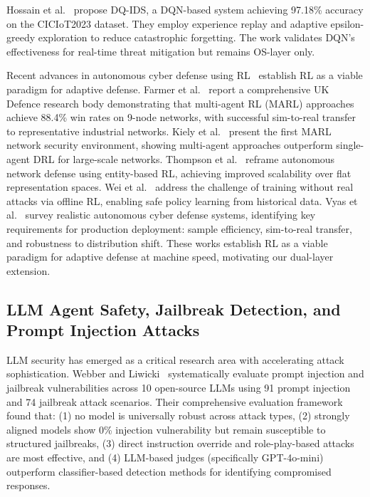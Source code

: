 \documentclass[conference]{IEEEtran}
\begin{document}
Hossain et al.~\cite{hossain2025deep} propose DQ-IDS, a DQN-based system achieving 97.18\% accuracy on the CICIoT2023 dataset. They employ experience replay and adaptive epsilon-greedy exploration to reduce catastrophic forgetting. The work validates DQN's effectiveness for real-time threat mitigation but remains OS-layer only.

Recent advances in autonomous cyber defense using RL~\cite{farmer2024rl,loevenich2025design,hammar2024rl4cybersecurity,kiely2025marl,thompson2024entity,wei2024offline,vyas2025deployment} establish RL as a viable paradigm for adaptive defense. Farmer et al.~\cite{farmer2024rl} report a comprehensive UK Defence research body demonstrating that multi-agent RL (MARL) approaches achieve 88.4\% win rates on 9-node networks, with successful sim-to-real transfer to representative industrial networks. Kiely et al.~\cite{kiely2025marl} present the first MARL network security environment, showing multi-agent approaches outperform single-agent DRL for large-scale networks. Thompson et al.~\cite{thompson2024entity} reframe autonomous network defense using entity-based RL, achieving improved scalability over flat representation spaces. Wei et al.~\cite{wei2024offline} address the challenge of training without real attacks via offline RL, enabling safe policy learning from historical data. Vyas et al.~\cite{vyas2025deployment} survey realistic autonomous cyber defense systems, identifying key requirements for production deployment: sample efficiency, sim-to-real transfer, and robustness to distribution shift. These works establish RL as a viable paradigm for adaptive defense at machine speed, motivating our dual-layer extension.

\subsection{LLM Agent Safety, Jailbreak Detection, and Prompt Injection Attacks}

LLM security has emerged as a critical research area with accelerating attack sophistication. Webber and Liwicki~\cite{webber2025jailbreak} systematically evaluate prompt injection and jailbreak vulnerabilities across 10 open-source LLMs using 91 prompt injection and 74 jailbreak attack scenarios. Their comprehensive evaluation framework found that: (1) no model is universally robust across attack types, (2) strongly aligned models show 0\% injection vulnerability but remain susceptible to structured jailbreaks, (3) direct instruction override and role-play-based attacks are most effective, and (4) LLM-based judges (specifically GPT-4o-mini) outperform classifier-based detection methods for identifying compromised responses.
\end{document}
